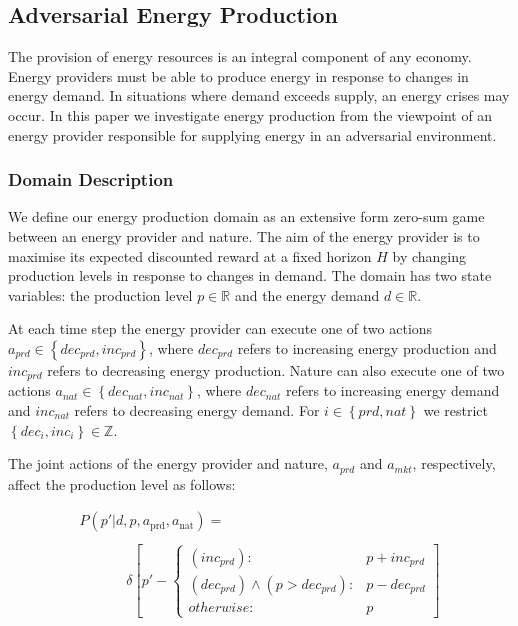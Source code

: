 \subsection{Adversarial Energy Production}

The provision of energy resources is an integral component of any
economy. Energy providers must be able to produce energy in response
to changes in energy demand. In situations where demand exceeds supply,
an energy crises may occur. In this paper we investigate energy 
production from the viewpoint of an energy provider responsible for 
supplying energy in an adversarial environment.

\subsubsection{Domain Description}

We define our energy production domain as an extensive form zero-sum
game between an energy provider and nature. The aim of the energy
provider is to maximise its expected discounted reward at a 
fixed horizon $H$ by changing production levels in response to changes in demand.
The domain has two state variables: the production level $p \in \mathbb{R}$ and the energy demand
$d \in \mathbb{R}$. 

At each time step the energy provider can execute one of two actions
$a_{prd} \in \left\{dec_{prd}, inc_{prd}\right\}$, where $dec_{prd}$ 
refers to increasing energy production and $inc_{prd}$ refers to decreasing
energy production. Nature can also execute one of two actions
$a_{nat} \in \left\{dec_{nat}, inc_{nat}\right\}$, where $dec_{nat}$ 
refers to increasing energy demand and $inc_{nat}$ refers to decreasing
energy demand. For $i \in \left\{prd, nat\right\}$ we restrict 
$\left\{dec_i, inc_i\right\} \in \mathbb{Z}$.

The joint actions of the energy provider and nature, $a_{prd}$ and
$a_{mkt}$, respectively, affect the production level as follows:

{\small 
\abovedisplayskip=0pt
\belowdisplayskip=0pt
\begin{align*}
&P(p' | d, p, a_{\text{prd}}, a_{\text{nat}}) = \\
\\
& \hspace{40pt} \delta \left[ p' - \begin{cases}
      (inc_{prd})  : & p + inc_{prd} \\
       (dec_{prd}) \wedge (p > dec_{prd}): & p - dec_{prd} \\
      otherwise: & p
    \end{cases} \right] & \\    
\end{align*}
}%

